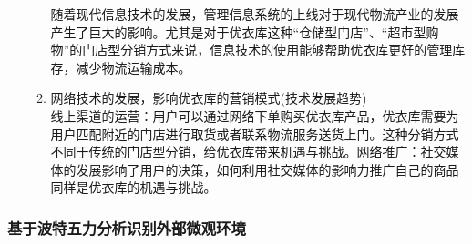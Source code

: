 \documentclass{xjtureport}
\begin{document}
\begin{enumerate}
\begin{enumerate}
        随着现代信息技术的发展，管理信息系统的上线对于现代物流产业的发展产生了巨大的影响。尤其是对于优衣库这种“仓储型门店”、“超市型购物”的门店型分销方式来说，信息技术的使用能够帮助优衣库更好的管理库存，减少物流运输成本。
        \item 网络技术的发展，影响优衣库的营销模式(技术发展趋势)\\
        线上渠道的运营：用户可以通过网络下单购买优衣库产品，优衣库需要为用户匹配附近的门店进行取货或者联系物流服务送货上门。这种分销方式不同于传统的门店型分销，给优衣库带来机遇与挑战。网络推广：社交媒体的发展影响了用户的决策，如何利用社交媒体的影响力推广自己的商品同样是优衣库的机遇与挑战。
    \end{enumerate}
\end{enumerate}
\subsubsection{基于波特五力分析识别外部微观环境}
\end{document}
